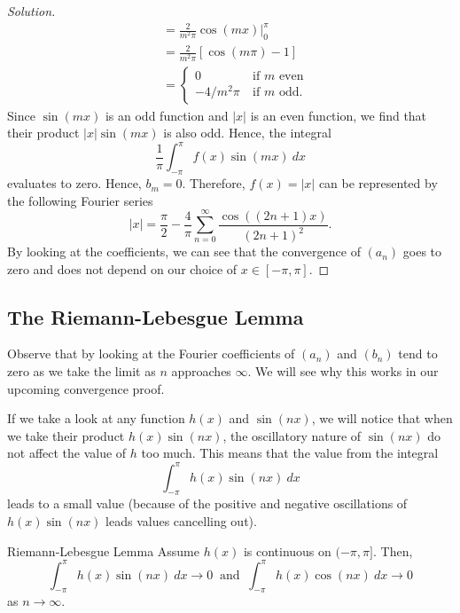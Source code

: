\begin{enumerate}
\begin{proof}[Solution]
\begin{align*}
                      &=  \frac{ 2 }{ m^{2}\pi  }  \cos(mx) \Big|_{0}^{\pi} \\ 
                      &= \frac{ 2 }{ m^{2} \pi  } [ \cos(m \pi) - 1 ] \\
                      &= 
                      \begin{cases}
                          0 \ &\text{if } m \text{ even} \\
                          -4/ m^{2}\pi \ &\text{if } m  \text{ odd}.
                      \end{cases}
            \end{align*}
            Since \( \sin(mx)  \) is an odd function and \( | x  |  \) is an even function, we find that their product \( | x |  \sin(mx)  \) is also odd. Hence, the integral 
            \[ \frac{ 1 }{ \pi  }  \int_{ -\pi }^{ \pi   } f(x) \sin(mx)   \ dx  \]
            evaluates to zero. Hence, \( b_{m} = 0  \). Therefore, \( f(x) = | x  |  \) can be represented by the following Fourier series
            \[  | x |  = \frac{ \pi  }{ 2 }  - \frac{ 4  }{ \pi  }  \sum_{ n=0  }^{ \infty  } \frac{ \cos((2n+1)x)  }{ (2n+1)^{2}  }.  \] By looking at the coefficients, we can see that the convergence of \( (a_{n}) \) goes to zero and does not depend on our choice of \( x \in [-\pi , \pi ] \).
        \end{proof}
\end{enumerate}

\subsection{The Riemann-Lebesgue Lemma}

Observe that by looking at the Fourier coefficients of \( (a_{n}) \) and \( (b_{n}) \) tend to zero as we take the limit as \( n  \) approaches \( \infty  \). We will see why this works in our upcoming convergence proof.

If we take a look at any function \( h(x)  \) and \( \sin(nx) \), we will notice that when we take their product \( h(x) \sin(nx) \), the oscillatory nature of \( \sin(nx) \) do not affect the value of \( h  \) too much. This means that the value from the integral 
\[  \int_{ - \pi  }^{ \pi  } h(x) \sin(nx)  \ dx \] 
leads to a small value (because of the positive and negative oscillations of \( h(x) \sin(nx) \) leads values cancelling out).

\begin{theorem}{Riemann-Lebesgue Lemma}{}
    Assume \( h(x)  \) is continuous on \( (-\pi , \pi]  \). Then, 
    \[  \int_{ -\pi  }^{ \pi  } h(x) \sin(nx) \ dx \to 0 \ \text{ and } \ \int_{ -\pi  }^{ \pi  } h(x) \cos(nx)  \ dx \to 0 \]
    as \( n \to \infty  \).
\end{theorem}

